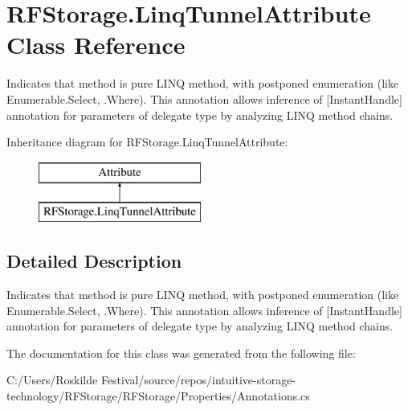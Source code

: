 \section{R\+F\+Storage.\+Linq\+Tunnel\+Attribute Class Reference}
\label{class_r_f_storage_1_1_linq_tunnel_attribute}


Indicates that method is pure L\+I\+NQ method, with postponed enumeration (like Enumerable.\+Select, .Where). This annotation allows inference of [Instant\+Handle] annotation for parameters of delegate type by analyzing L\+I\+NQ method chains.  


Inheritance diagram for R\+F\+Storage.\+Linq\+Tunnel\+Attribute\+:\begin{figure}[H]
\begin{center}
\leavevmode
\includegraphics[height=2.000000cm]{class_r_f_storage_1_1_linq_tunnel_attribute}
\end{center}
\end{figure}


\subsection{Detailed Description}
Indicates that method is pure L\+I\+NQ method, with postponed enumeration (like Enumerable.\+Select, .Where). This annotation allows inference of [Instant\+Handle] annotation for parameters of delegate type by analyzing L\+I\+NQ method chains. 



The documentation for this class was generated from the following file\+:\begin{DoxyCompactItemize}
\item 
C\+:/\+Users/\+Roskilde Festival/source/repos/intuitive-\/storage-\/technology/\+R\+F\+Storage/\+R\+F\+Storage/\+Properties/Annotations.\+cs\end{DoxyCompactItemize}
